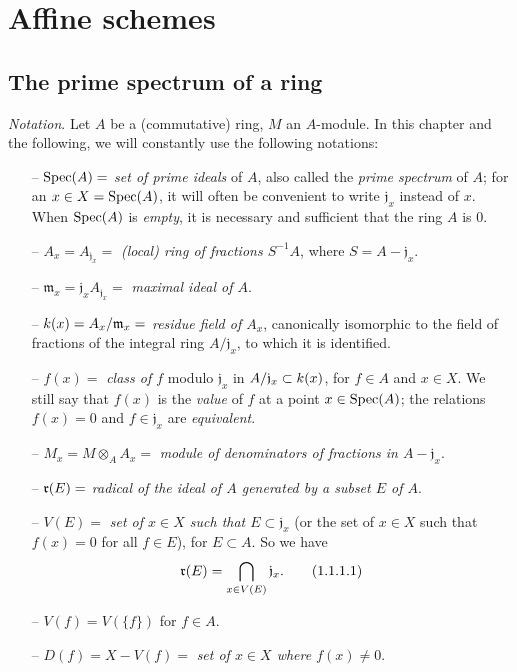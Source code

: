 \setcounter{section}{0}
\section{Affine schemes}
\label{section-affine-schemes}

\setcounter{subsection}{0}
\subsection{The prime spectrum of a ring}
\label{subsection-prime-spec}

\begin{env}[1.1.1]
\label{env-1.1.1.1}
{\em Notation}. Let $A$ be a (commutative) ring, $M$ an $A$-module. In
this chapter and the following, we will constantly use the following notations:
\begin{itemize}
  \item[--] ${\mathop{\mathrm{Spec}}\nolimits}(A)=$ {\em set of prime ideals} of $A$, also called the
    {\em prime spectrum} of $A$; for an $x\in X={\mathop{\mathrm{Spec}}\nolimits}(A)$, it will often be
    convenient to write $\mathfrak{j}_x$ instead of $x$. When ${\mathop{\mathrm{Spec}}\nolimits}(A)$ is
    {\em empty}, it is necessary and sufficient that the ring $A$ is $0$.
  \item[--] $A_x=A_{\mathfrak{j}_x}=$ {\em (local) ring of fractions $S^{-1}A$},
    where $S=A-\mathfrak{j}_x$.
  \item[--] $\mathfrak{m}_x=\mathfrak{j}_x A_{\mathfrak{j}_x}=$ {\em maximal ideal of $A$}.
  \item[--] $k(x)=A_x/\mathfrak{m}_x=$ {\em residue field of $A_x$}, canonically
    isomorphic to the field of fractions of the integral ring $A/\mathfrak{j}_x$, to which
    it is identified.
  \item[--] $f(x)=$ {\em class of $f$} modulo $\mathfrak{j}_x$ in
    $A/\mathfrak{j}_x\subset k(x)$, for $f\in A$ and $x\in X$. We still say that $f(x)$
    is the {\em value} of $f$ at a point $x\in{\mathop{\mathrm{Spec}}\nolimits}(A)$; the relations $f(x)=0$ and
    $f\in\mathfrak{j}_x$ are {\em equivalent}.
  \item[--] $M_x=M\otimes_A A_x=$ {\em module of denominators of fractions in
    $A-\mathfrak{j}_x$}.
  \item[--] $\mathfrak{r}(E)=$ {\em radical of the ideal of $A$ generated by a subset $E$ of $A$}.
  \item[--] $V(E)=$ {\em set of $x\in X$ such that $E\subset\mathfrak{j}_x$} (or the set of
    $x\in X$ such that $f(x)=0$ for all $f\in E$), for $E\subset A$. So we have
    \[
      \mathfrak{r}(E)=\bigcap_{x\in V(E)}\mathfrak{j}_x.
      \tag{1.1.1.1}
    \]
  \item[--] $V(f)=V(\{f\})$ for $f\in A$.
  \item[--] $D(f)=X-V(f)=$ {\em set of $x\in X$ where $f(x)\neq 0$}.
\end{itemize}
\end{env}

